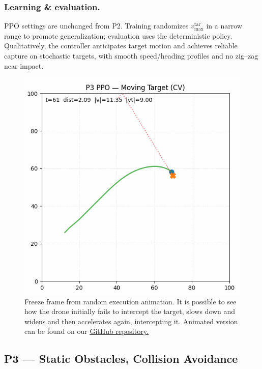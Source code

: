         \subsubsection{Learning \& evaluation.}
            PPO settings are unchanged from P2. Training randomizes $v^{\mathrm{tar}}_{\max}$ in a narrow range to promote generalization; evaluation uses the deterministic policy. Qualitatively, the controller anticipates target motion and achieves reliable capture on stochastic targets, with smooth speed/heading profiles and no zig–zag near impact.

        \begin{figure}[H]
            \centering
            \includegraphics[scale=0.4]{Figures/step_3_t2.png}
            \caption{Freeze frame from random execution animation. It is possible to see how the drone initially fails to intercept the target, slows down and widens and then accelerates again, intercepting it. Animated version can be found on our \underline{\href{https://github.com/rolandoinnamorati/swarm-rl}{GitHub repository.}}}
        \end{figure}

    \subsection{P3 — Static Obstacles, Collision Avoidance}
